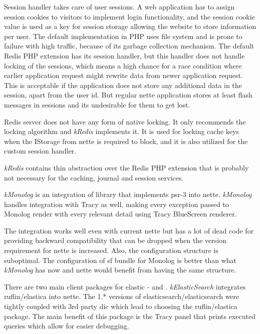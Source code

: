 Session handler takes care of user sessions. A web application has to assign session cookies to visitors to implement login functionality, and the session cookie value is used as a key for session storage allowing the website to store information per user. The default implementation in PHP uses file system and is prone to failure with high traffic, because of its garbage collection mechanism. The default Redis PHP extension has its session handler, but this handler does not handle locking of the sessions, which means a high chance for a race condition where earlier application request might rewrite data from newer application request. This is acceptable if the application does not store any additional data in the session, apart from the user id. But regular \gls{nette} application stores at least flash messages in sessions and its undesirable for them to get lost.

Redis server does not have any form of native locking. It only recommends the locking algorithm  and \textit{\gls{kRedis}} implements it.
It is used for locking cache keys when the IStorage from \gls{nette} is required to block, and it is also utilized for the custom session handler.

\textit{\gls{kRedis}} contains thin abstraction over the Redis PHP extension that is probably not necessary for the caching, journal and session services.

 \label{sec:state:monolog}

\textit{\gls{kMonolog}} is an integration of  library that implements \gls{psr}-3 into \gls{nette}. \textit{\gls{kMonolog}} handles integration with Tracy as well, making every exception passed to Monolog render with every relevant detail using Tracy BlueScreen renderer.

The integration works well even with current \gls{nette} but has a lot of dead code for providing backward compatibility that can be dropped when the version requirement for \gls{nette} is increased. Also, the configuration structure is suboptimal. The configuration of \gls{sf} bundle for Monolog is better than what \textit{\gls{kMonolog}} has now and \gls{nette} would benefit from having the same structure.

 \label{sec:state:elastic-search}

There are two main client packages for \gls{elastic} -  and . \textit{\gls{kElasticSearch}} integrates ruflin/elastica into \gls{nette}. The 1.* versions of elasticsearch/elasticsearch were tightly coupled with 3rd party \gls{dic} which lead to choosing the ruflin/elastica package. The main benefit of this package is the Tracy panel that prints executed queries which allow for easier debugging.

